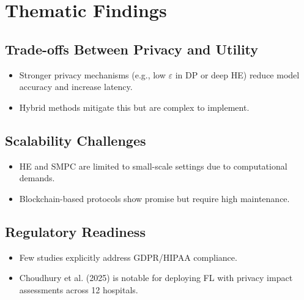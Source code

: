 \documentclass[12pt]{report}
\begin{document}
\section{Thematic Findings}

\subsection{Trade-offs Between Privacy and Utility}
\begin{itemize}
    \item Stronger privacy mechanisms (e.g., low $\varepsilon$ in DP or deep HE) reduce model accuracy and increase latency.
    \item Hybrid methods mitigate this but are complex to implement.
\end{itemize}

\subsection{Scalability Challenges}
\begin{itemize}
    \item HE and SMPC are limited to small-scale settings due to computational demands.
    \item Blockchain-based protocols show promise but require high maintenance.
\end{itemize}

\subsection{Regulatory Readiness}
\begin{itemize}
    \item Few studies explicitly address GDPR/HIPAA compliance.
    \item Choudhury et al. (2025) is notable for deploying FL with privacy impact assessments across 12 hospitals.
\end{itemize}
\end{document}
